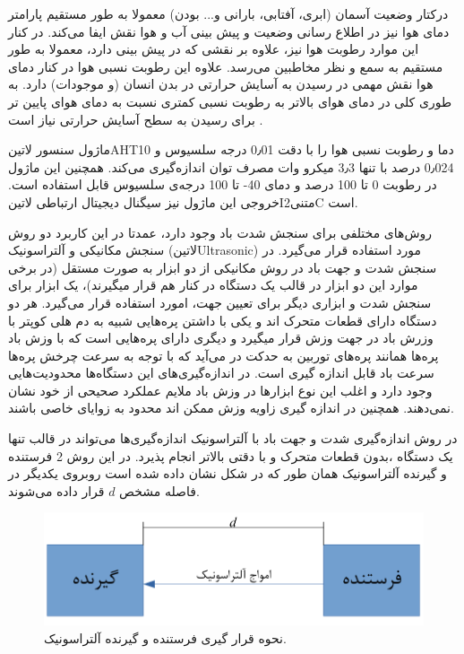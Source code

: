 
درکتار وضعیت آسمان (ابری، آفتابی، بارانی و... بودن) معمولا به طور مستقیم پارامتر دمای هوا نیز در اطلاع رسانی وضعیت و پیش بینی آب و هوا نقش ایفا می‌کند. در کنار این موارد رطوبت هوا نیز، علاوه بر نقشی که در پیش بینی دارد، معمولا به طور مستقیم به سمع و نظر مخاطبین می‌رسد. علاوه این رطوبت نسبی هوا در کنار دمای هوا نقش مهمی در رسیدن به آسایش حرارتی در بدن انسان (و موجودات) دارد. به طوری کلی در دمای هوای بالاتر به رطوبت نسبی کمتری نسبت به دمای هوای پایین تر برای رسیدن به سطح آسایش  حرارتی نیاز است . 

ماژول سنسور ‌لاتین{AHT10} دما و رطوبت نسبی هوا را با دقت 0٫01 درجه سلسیوس و 0٫024 درصد با تنها 3٫3 میکرو وات مصرف توان اندازه‌گیری می‌کند. همچنین این ماژول در رطوبت 0 تا 100 درصد و دمای  40- تا 100 درجه‌ی سلسیوس قابل استفاده است. خروجی این ماژول نیز سیگنال دیجیتال ارتباطی ‌لاتین{I‌متنی{2}C} است. 


روش‌های مختلفی برای سنجش شدت باد وجود دارد، عمدتا در این کاربرد دو روش سنجش مکانیکی و آلتراسونیک (‌لاتین{Ultrasonic}) مورد استفاده قرار می‌گیرد. در سنجش شدت و جهت باد در روش مکانیکی از دو ابزار به صورت مستقل (در برخی موارد این دو ابزار در قالب یک دستگاه در کنار هم قرار میگیرند)، یک ابزار برای سنجش شدت و ابزاری دیگر برای تعیین جهت، امورد استفاده قرار می‌گیرد. هر دو دستگاه دارای قطعات متحرک اند و یکی با داشتن پره‌هایی شبیه به دم هلی کوپتر با وزرش باد در جهت وزش قرار میگیرد و دیگری دارای پره‌هایی است که با وزش باد پره‌ها همانند پره‌های توربین به حدکت در می‌آید که با توجه به سرعت چرخش پره‌ها سرعت باد قابل اندازه‌ گیری است. در اندازه‌گیری‌های این دستگاه‌ها محدودیت‌هایی وجود دارد و اغلب این نوع ابزارها در وزش باد ملایم عملکرد صحیحی از خود نشان نمی‌دهند. همچنین در اندازه گیری زاویه وزش ممکن اند محدود به زوایای خاصی باشند. 

در روش اندازه‌گیری شدت و جهت باد با آلتراسونیک اندازه‌گیری‌ها می‌تواند در قالب تنها یک دستگاه ،بدون قطعات متحرک و با دقتی بالاتر انجام پذیرد. در این روش 2 فرستنده و گیرنده آلتراسونیک همان طور که در شکل  نشان داده شده است روبروی یکدیگر در فاصله‌ مشخص $d$ قرار داده می‌شوند.

\begin{figure}[!h]
	\centering
	\includegraphics[width=0.6\linewidth]{Assets/ultrasonic one axis.pdf}
	\caption{نحوه قرار گیری فرستنده و گیرنده آلتراسونیک.}
	\label{fig:oneAxisUltrasonic}
\end{figure}

